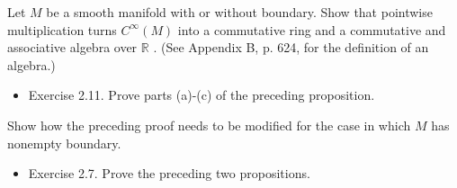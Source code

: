 \begin{exercise}
\label{exer:2-1}


Let $M$ be a smooth manifold with or without boundary. Show that pointwise multiplication turns ${C}^{\infty }\left( M\right)$ into a commutative ring and a commutative and associative algebra over $\mathbb{R}$ . (See Appendix B, p. 624, for the definition of an algebra.)
\end{exercise}

\begin{exercise}
\label{exer:2-11}


\begin{itemize}
\item Exercise 2.11. Prove parts (a)-(c) of the preceding proposition.
\end{itemize}
\end{exercise}

\begin{exercise}
\label{exer:2-24}


Show how the preceding proof needs to be modified for the case in which $M$ has nonempty boundary.
\end{exercise}

\begin{exercise}
\label{exer:2-7}


\begin{itemize}
\item Exercise 2.7. Prove the preceding two propositions.
\end{itemize}
\end{exercise}
